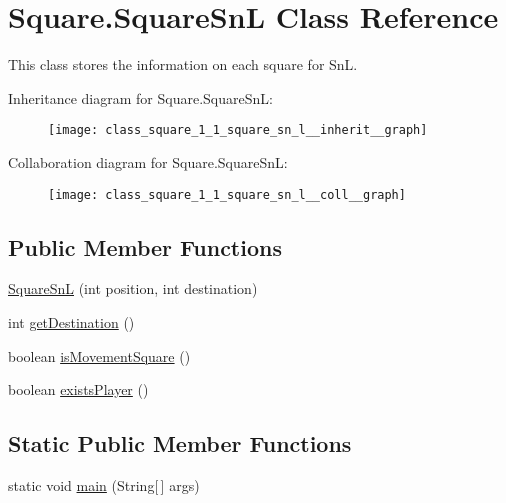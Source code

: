 \hypertarget{class_square_1_1_square_sn_l}{}\section{Square.\+Square\+Sn\+L Class Reference}
\label{class_square_1_1_square_sn_l}


This class stores the information on each square for Sn\+L.  




Inheritance diagram for Square.\+Square\+Sn\+L\+:\nopagebreak
\begin{figure}[H]
\begin{center}
\leavevmode
\texttt{[image: class\_square\_1\_1\_square\_sn\_l\_\_inherit\_\_graph]}
\end{center}
\end{figure}


Collaboration diagram for Square.\+Square\+Sn\+L\+:\nopagebreak
\begin{figure}[H]
\begin{center}
\leavevmode
\texttt{[image: class\_square\_1\_1\_square\_sn\_l\_\_coll\_\_graph]}
\end{center}
\end{figure}
\subsection*{Public Member Functions}
\begin{DoxyCompactItemize}
\item 
\hyperlink{class_square_1_1_square_sn_l_ac89482de8a579e2b2249f9d8bf652351}{Square\+Sn\+L} (int position, int destination)
\item 
int \hyperlink{class_square_1_1_square_sn_l_acb377b2ceb8dd5b8d65bba391f4c256d}{get\+Destination} ()
\item 
boolean \hyperlink{class_square_1_1_square_sn_l_ad948a877cff45a872082f23d72924770}{is\+Movement\+Square} ()
\item 
boolean \hyperlink{class_square_1_1_square_sn_l_a7f23505690a2a6ccfe9126448f66ddeb}{exists\+Player} ()
\end{DoxyCompactItemize}
\subsection*{Static Public Member Functions}
\begin{DoxyCompactItemize}
\item 
static void \hyperlink{class_square_1_1_square_sn_l_ac30c492a8a5c6f0f9bf43faa069dfa5c}{main} (String\mbox{[}$\,$\mbox{]} args)
\end{DoxyCompactItemize}
